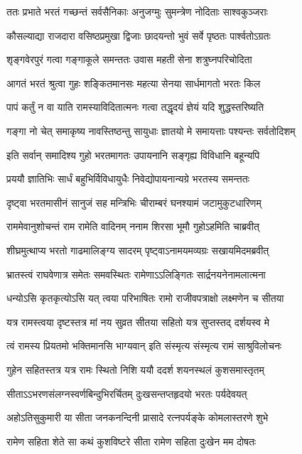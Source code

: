 \twolineshloka
{ततः प्रभाते भरतं गच्छन्तं सर्वसैनिकाः}
{अनुजग्मुः सुमन्त्रेण नोदिताः साश्वकुञ्जराः} %

\twolineshloka
{कौसल्याद्या राजदारा वसिष्ठप्रमुखा द्विजाः}
{छादयन्तो भुवं सर्वे पृष्ठतः पार्श्वतोऽग्रतः} %

\twolineshloka
{शृङ्गवेरपुरं गत्वा गङ्गाकूले समन्ततः}
{उवास महती सेना शत्रुघ्नपरिचोदिता} %

\twolineshloka
{आगतं भरतं श्रुत्वा गुहः शङ्कितमानसः}
{महत्या सेनया सार्धमागतो भरतः किल} %

\twolineshloka
{पापं कर्तुं न वा याति रामस्याविदितात्मनः}
{गत्वा तद्धृदयं ज्ञेयं यदि शुद्धस्तरिष्यति} %

\twolineshloka
{गङ्गा नो चेत् समाकृष्य नावस्तिष्ठन्तु सायुधाः}
{ज्ञातयो मे समायत्ताः पश्यन्तः सर्वतोदिशम्} %

\twolineshloka
{इति सर्वान् समादिश्य गुहो भरतमागतः}
{उपायनानि सङ्गृह्य विविधानि बहून्यपि} %

\twolineshloka
{प्रययौ ज्ञातिभिः सार्धं बहुभिर्विविधायुधैः}
{निवेद्योपायनान्यग्रे भरतस्य समन्ततः} %

\twolineshloka
{दृष्ट्वा भरतमासीनं सानुजं सह मन्त्रिभिः}
{चीराम्बरं घनश्यामं जटामुकुटधारिणम्} %

\twolineshloka
{राममेवानुशोचन्तं राम रामेति वादिनम्}
{ननाम शिरसा भूमौ गुहोऽहमिति चाब्रवीत्} %

\twolineshloka
{शीघ्रमुत्थाप्य भरतो गाढमालिङ्ग्य सादरम्}
{पृष्ट्वाऽनामयमव्यग्रः सखायमिदमब्रवीत्} %

\twolineshloka
{भ्रातस्त्वं राघवेणात्र समेतः समवस्थितः}
{रामेणाऽऽलिङ्गितः सार्द्रनयनेनामलात्मना} %

\twolineshloka
{धन्योऽसि कृतकृत्योऽसि यत् त्वया परिभाषितः}
{रामो राजीवपत्राक्षो लक्ष्मणेन च सीतया} %

\twolineshloka
{यत्र रामस्त्वया दृष्टस्तत्र मां नय सुव्रत}
{सीतया सहितो यत्र सुप्तस्तद् दर्शयस्व मे} %

\twolineshloka
{त्वं रामस्य प्रियतमो भक्तिमानसि भाग्यवान्}
{इति संस्मृत्य संस्मृत्य रामं साश्रुविलोचनः} %

\twolineshloka
{गुहेन सहितस्तत्र यत्र रामः स्थितो निशि}
{ययौ ददर्श शयनस्थलं कुशसमास्तृतम्} %

\twolineshloka
{सीताऽऽभरणसंलग्नस्वर्णबिन्दुभिरर्चितम्}
{दुःखसन्तप्तहृदयो भरतः पर्यदेवयत्} %

\twolineshloka
{अहोऽतिसुकुमारी या सीता जनकनन्दिनी}
{प्रासादे रत्नपर्यङ्के कोमलास्तरणे शुभे} %

\twolineshloka
{रामेण सहिता शेते सा कथं कुशविष्टरे}
{सीता रामेण सहिता दुःखेन मम दोषतः} %

